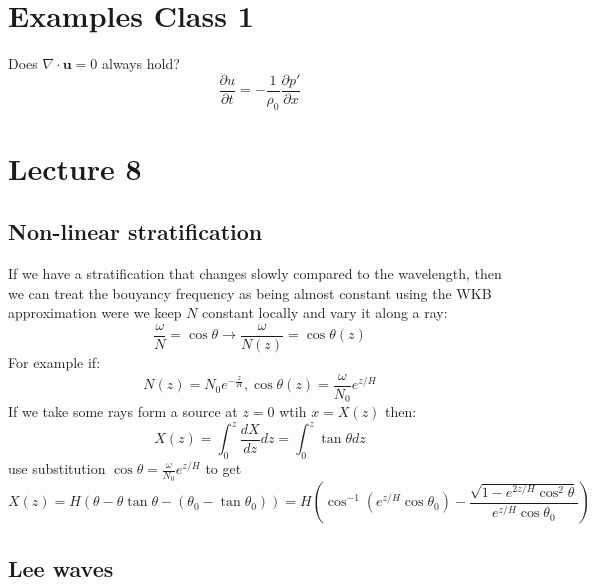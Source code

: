 \documentclass{article}
\begin{document}
\section{Examples Class 1}
Does $\nabla \cdot \bm u = 0$ always hold?
$$
\frac{\partial u}{\partial t} = - \frac{1}{\rho_0} \frac{\partial p'}{\partial x}
$$
\section{Lecture 8}
\subsection{Non-linear stratification}
If we have a stratification that changes slowly compared to the wavelength, then we can treat the bouyancy frequency as being almost constant using the WKB approximation were we keep $N$ constant locally and vary it along a ray:
$$
\frac{\omega}{N}= \cos \theta \rightarrow \frac{\omega}{N(z)} = \cos \theta(z)
$$
For example if:
$$
N(z) = N_0 e^{-\frac{z}{H}}, \cos \theta(z) = \frac{\omega}{N_0} e^{z/H}
$$
If we take some rays form a source at $z=0$ wtih $x= X(z)$ then:
$$
X(z) = \int_0^z \frac{dX}{dz} dz = \int^z_0 \tan \theta dz
$$
use substitution $\cos \theta = \frac{\omega}{N_0} e^{z/H}$ to get
$$
X(z) = H( \theta - \theta \tan \theta - (\theta_0 - \tan \theta_0)) = H ( \cos^{-1} ( e^{z/H} \cos \theta_0) - \frac{\sqrt{1 - e^{2 z/H} \cos^2 \theta}}{e^{z/H} \cos \theta_0})
$$
\subsection{Lee waves}
\end{document}
